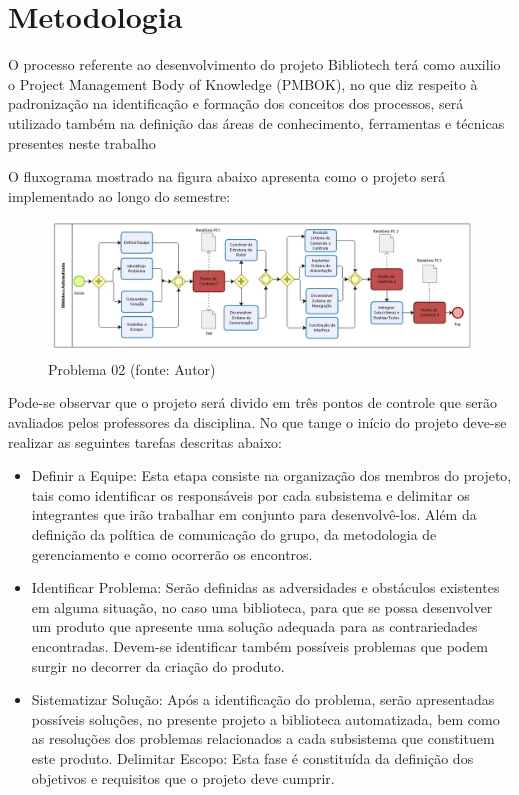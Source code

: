 \chapter[Metodologia] {Metodologia}

O processo referente ao desenvolvimento do projeto Bibliotech terá como auxilio o Project Management Body of Knowledge (PMBOK), no que diz respeito à padronização na identificação e formação dos conceitos dos processos, será utilizado também na definição das áreas de conhecimento, ferramentas e técnicas presentes neste trabalho \cite{pmbok2004}

O fluxograma mostrado na figura abaixo apresenta como o projeto será implementado ao longo do semestre: 

\begin{figure}[!h]
\centering
\includegraphics[scale=0.65, angle = 360]{figuras/fluxograma_metodologia}
\caption[]{Problema 02 (fonte: Autor)}
\end{figure}
\FloatBarrier

Pode-se observar que o projeto será divido em três pontos de controle que serão avaliados pelos professores da disciplina. No que tange o início do projeto deve-se realizar as seguintes tarefas descritas abaixo:

\begin{itemize}
\item Definir a Equipe: Esta etapa consiste na organização dos membros do projeto, tais como identificar os responsáveis por cada subsistema e delimitar os integrantes que irão trabalhar em conjunto para desenvolvê-los. Além da definição da política de comunicação do grupo, da metodologia de gerenciamento e como ocorrerão os encontros. 
\item Identificar Problema: Serão definidas as adversidades e obstáculos existentes em alguma situação, no caso uma biblioteca, para que se possa desenvolver um produto que apresente uma solução adequada para as contrariedades encontradas. Devem-se identificar também possíveis problemas que podem surgir no decorrer da criação do produto.
\item Sistematizar Solução: Após a identificação do problema, serão apresentadas possíveis soluções, no presente projeto a biblioteca automatizada, bem como as resoluções dos problemas relacionados a cada subsistema que constituem este produto.
Delimitar Escopo: Esta fase é constituída da definição dos objetivos e requisitos que o projeto deve cumprir.
\end{itemize}

